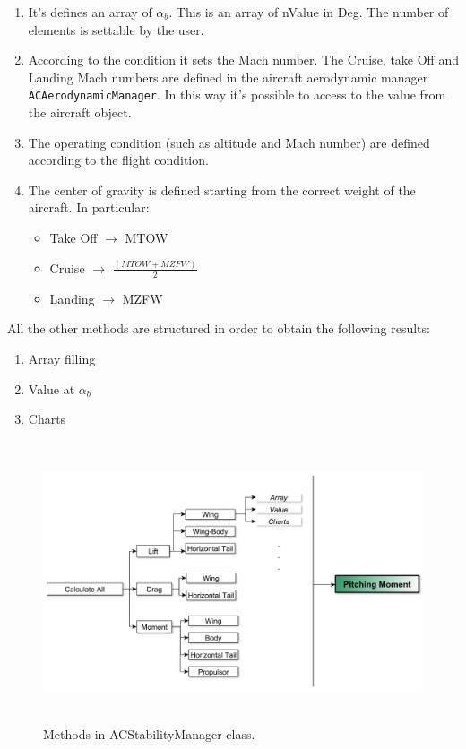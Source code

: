 \begin{enumerate}
	\item It's defines an array of $\alpha_b$. This is an array of nValue in Deg. The number of elements is settable by the user.
	\item According to the condition it sets the Mach number. The Cruise, take Off and Landing Mach numbers are defined in the aircraft aerodynamic manager \texttt{ACAerodynamicManager}. In this way it's possible to access to the value from the aircraft object.
	\item The operating condition (such as altitude and Mach number) are defined according to the flight condition.
	\item The center of gravity is defined starting from the correct weight of the aircraft. In particular:
	\begin{itemize}
		\item Take Off $\rightarrow$ MTOW
		\item Cruise $\rightarrow$ $\frac{(MTOW + MZFW)}{2}$
		\item Landing $\rightarrow$  MZFW
	\end{itemize}
\end{enumerate}



 All the other methods are structured in order to obtain the following results:
\begin{enumerate}
	\item Array filling
	\item Value at $\alpha_b$
	\item Charts
\end{enumerate}
\begin{figure}[H]
	\centering
	\includegraphics[height=8.3cm]{Immagini/acclass}
	\caption{Methods in ACStabilityManager class.}
	\label{acc}
\end{figure}


